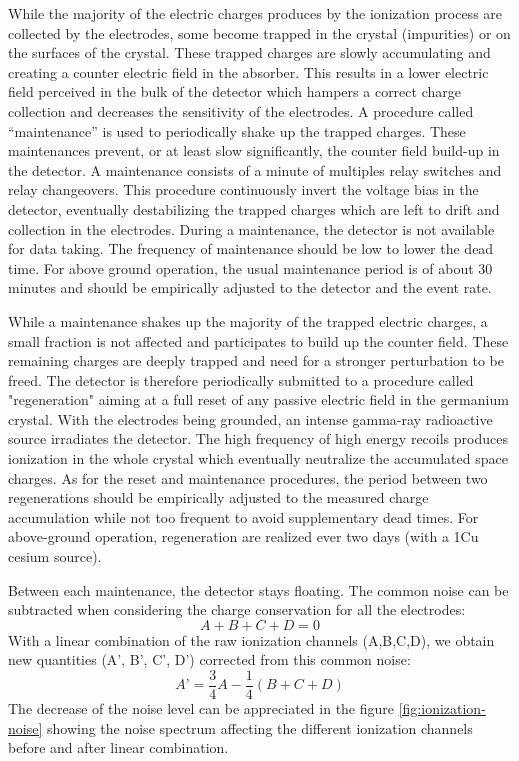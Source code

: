 While the majority of the electric charges produces by the ionization process are collected by the electrodes, some become trapped in the crystal (impurities) or on the surfaces of the crystal. These trapped charges are slowly accumulating and creating a counter electric field in the absorber. This results in a lower electric field perceived in the bulk of the detector which hampers a correct charge collection and decreases the sensitivity of the electrodes.
A procedure called “maintenance” is used to periodically shake up the trapped charges. These maintenances prevent, or at least slow significantly, the counter field build-up in the detector. A maintenance consists of a minute of multiples relay switches and relay changeovers. This procedure continuously invert the voltage bias in the detector, eventually destabilizing the trapped charges which are left to drift and collection in the electrodes.
During a maintenance, the detector is not available for data taking. The frequency of maintenance should be low to lower the dead time. For above ground operation, the usual maintenance period is of about 30 minutes and should be empirically adjusted to the detector and the event rate.

While a maintenance shakes up the majority of the trapped electric charges, a small fraction is not affected and participates to build up the counter field. These remaining charges are deeply trapped and need for a stronger perturbation to be freed. The detector is therefore periodically submitted to a procedure called "regeneration" aiming at a full reset of any passive electric field in the germanium crystal. With the electrodes being grounded, an intense gamma-ray radioactive source irradiates the detector. The high frequency of high energy recoils produces ionization in the whole crystal which eventually neutralize the accumulated space charges. 
As for the reset and maintenance procedures, the period between two regenerations should be empirically adjusted to the measured charge accumulation while not too frequent to avoid supplementary dead times. For above-ground operation, regeneration are realized ever two days (with a 1Cu cesium source).

Between each maintenance, the detector stays floating. The common noise can be subtracted when considering the charge conservation for all the electrodes:
\begin{equation}
\label{eq:charge-conservation}
A + B + C + D = 0
\end{equation}
With a linear combination of the raw ionization channels (A,B,C,D), we obtain new quantities (A’, B’, C’, D’) corrected from this common noise:
\begin{equation}
\label{eq:common-noise-subtraction}
A’ = \frac{3}{4} A - \frac{1}{4} \left( B + C + D \right)
\end{equation} 
The decrease of the noise level can be appreciated in the figure \ref{fig:ionization-noise} showing the noise spectrum affecting the different ionization channels before and after linear combination.

